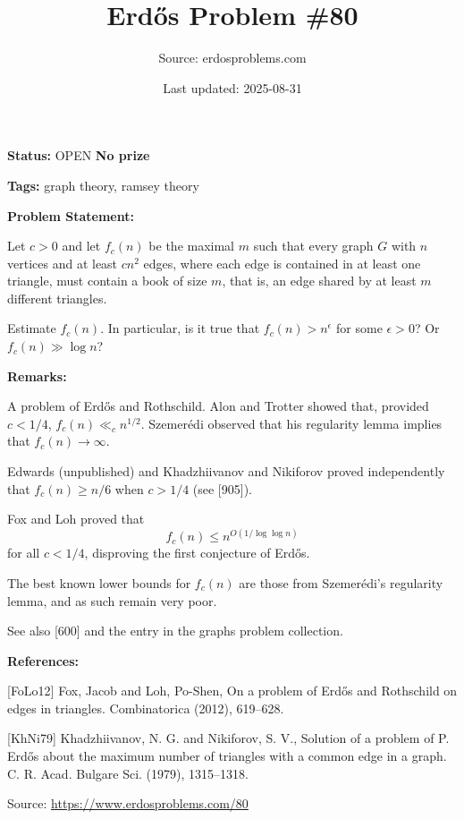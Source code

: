 \documentclass{article}
\title{Erd\H{o}s Problem \#80}
\date{Last updated: 2025-08-31}
\author{Source: erdosproblems.com}
\begin{document}
\maketitle

\noindent\textbf{Status:} OPEN \quad \textbf{No prize}

\noindent\textbf{Tags:} graph theory, ramsey theory

\medskip
\noindent\textbf{Problem Statement:}

Let $c>0$ and let $f_c(n)$ be the maximal $m$ such that every graph $G$ with $n$ vertices and at least $cn^2$ edges, where each edge is contained in at least one triangle, must contain a book of size $m$, that is, an edge shared by at least $m$ different triangles. 

Estimate $f_c(n)$. In particular, is it true that $f_c(n)>n^{\epsilon}$ for some $\epsilon>0$? Or $f_c(n)\gg \log n$?

\bigskip
\noindent\textbf{Remarks:}

A problem of Erd\H{o}s and Rothschild. Alon and Trotter showed that, provided $c<1/4$, $f_c(n)\ll_c n^{1/2}$. Szemer\'{e}di observed that his regularity lemma implies that $f_c(n)\to \infty$.

Edwards (unpublished) and Khadzhiivanov and Nikiforov \cite{KhNi79} proved independently that $f_c(n) \geq n/6$ when $c>1/4$ (see [905]).

Fox and Loh \cite{FoLo12} proved that\[f_c(n) \leq n^{O(1/\log\log n)}\]for all $c<1/4$, disproving the first conjecture of Erd\H{o}s.

The best known lower bounds for $f_c(n)$ are those from Szemer\'{e}di's regularity lemma, and as such remain very poor.

See also [600] and the entry in the graphs problem collection.

\bigskip
\noindent\textbf{References:}

[FoLo12] Fox, Jacob and Loh, Po-Shen, On a problem of Erd\H{o}s and {R}othschild on edges in
triangles. Combinatorica (2012), 619--628.
 
 [KhNi79] Khadzhiivanov, N. G. and Nikiforov, S. V., Solution of a problem of {P}. Erd\H{o}s about the maximum
number of triangles with a common edge in a graph. C. R. Acad. Bulgare Sci. (1979), 1315--1318.

\bigskip
\noindent\small{Source: \url{https://www.erdosproblems.com/80}}
\end{document}
